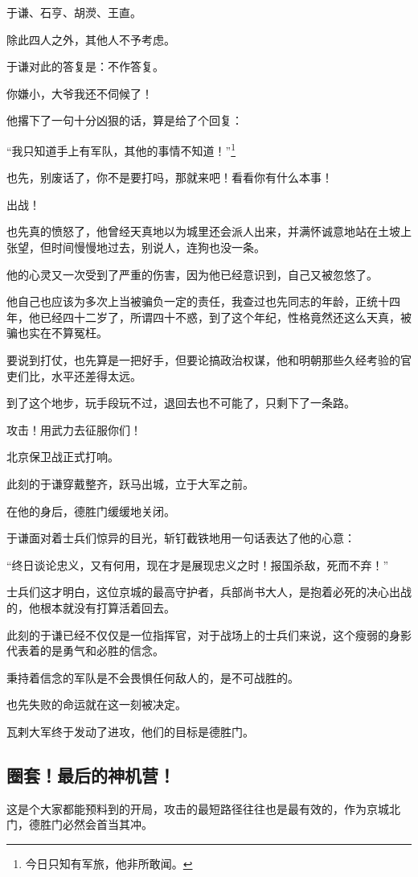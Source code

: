 \begin{multicols}{\theparacolNo}
于谦、石亨、胡濙、王直。

除此四人之外，其他人不予考虑。

于谦对此的答复是：不作答复。

你嫌小，大爷我还不伺候了！

他撂下了一句十分凶狠的话，算是给了个回复：

“我只知道手上有军队，其他的事情不知道！”\footnote{今日只知有军旅，他非所敢闻。}

也先，别废话了，你不是要打吗，那就来吧！看看你有什么本事！

出战！

也先真的愤怒了，他曾经天真地以为城里还会派人出来，并满怀诚意地站在土坡上张望，但时间慢慢地过去，别说人，连狗也没一条。

他的心灵又一次受到了严重的伤害，因为他已经意识到，自己又被忽悠了。

他自己也应该为多次上当被骗负一定的责任，我查过也先同志的年龄，正统十四年，他已经四十二岁了，所谓四十不惑，到了这个年纪，性格竟然还这么天真，被骗也实在不算冤枉。

要说到打仗，也先算是一把好手，但要论搞政治权谋，他和明朝那些久经考验的官吏们比，水平还差得太远。

到了这个地步，玩手段玩不过，退回去也不可能了，只剩下了一条路。

攻击！用武力去征服你们！

北京保卫战正式打响。

此刻的于谦穿戴整齐，跃马出城，立于大军之前。

在他的身后，德胜门缓缓地关闭。

于谦面对着士兵们惊异的目光，斩钉截铁地用一句话表达了他的心意：

“终日谈论忠义，又有何用，现在才是展现忠义之时！报国杀敌，死而不弃！”

士兵们这才明白，这位京城的最高守护者，兵部尚书大人，是抱着必死的决心出战的，他根本就没有打算活着回去。

此刻的于谦已经不仅仅是一位指挥官，对于战场上的士兵们来说，这个瘦弱的身影代表着的是勇气和必胜的信念。

秉持着信念的军队是不会畏惧任何敌人的，是不可战胜的。

也先失败的命运就在这一刻被决定。

瓦剌大军终于发动了进攻，他们的目标是德胜门。

\subsection{圈套！最后的神机营！}
这是个大家都能预料到的开局，攻击的最短路径往往也是最有效的，作为京城北门，德胜门必然会首当其冲。


\end{multicols}
